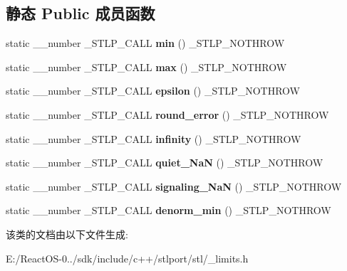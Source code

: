 \subsection*{静态 Public 成员函数}
\begin{DoxyCompactItemize}
\item 
\mbox{\label{class___numeric__limits__base_a5df53ee80883ac0ef0ba931ebc8cdec0}} 
static \+\_\+\+\_\+number \+\_\+\+S\+T\+L\+P\+\_\+\+C\+A\+LL {\bfseries min} () \+\_\+\+S\+T\+L\+P\+\_\+\+N\+O\+T\+H\+R\+OW
\item 
\mbox{\label{class___numeric__limits__base_a5b8a09617c24b0a9a44a8865344ba6ec}} 
static \+\_\+\+\_\+number \+\_\+\+S\+T\+L\+P\+\_\+\+C\+A\+LL {\bfseries max} () \+\_\+\+S\+T\+L\+P\+\_\+\+N\+O\+T\+H\+R\+OW
\item 
\mbox{\label{class___numeric__limits__base_a41abb8cff48dfdfd0837471127ff77cd}} 
static \+\_\+\+\_\+number \+\_\+\+S\+T\+L\+P\+\_\+\+C\+A\+LL {\bfseries epsilon} () \+\_\+\+S\+T\+L\+P\+\_\+\+N\+O\+T\+H\+R\+OW
\item 
\mbox{\label{class___numeric__limits__base_a6d32ab73462daf33275806255beeaea2}} 
static \+\_\+\+\_\+number \+\_\+\+S\+T\+L\+P\+\_\+\+C\+A\+LL {\bfseries round\+\_\+error} () \+\_\+\+S\+T\+L\+P\+\_\+\+N\+O\+T\+H\+R\+OW
\item 
\mbox{\label{class___numeric__limits__base_a8271331d1179bf6fa70550590bda1975}} 
static \+\_\+\+\_\+number \+\_\+\+S\+T\+L\+P\+\_\+\+C\+A\+LL {\bfseries infinity} () \+\_\+\+S\+T\+L\+P\+\_\+\+N\+O\+T\+H\+R\+OW
\item 
\mbox{\label{class___numeric__limits__base_a112e36a36d4f771ded7a70427e8d24ec}} 
static \+\_\+\+\_\+number \+\_\+\+S\+T\+L\+P\+\_\+\+C\+A\+LL {\bfseries quiet\+\_\+\+NaN} () \+\_\+\+S\+T\+L\+P\+\_\+\+N\+O\+T\+H\+R\+OW
\item 
\mbox{\label{class___numeric__limits__base_a97f37ea59a7953c5490a91eee25eb2e0}} 
static \+\_\+\+\_\+number \+\_\+\+S\+T\+L\+P\+\_\+\+C\+A\+LL {\bfseries signaling\+\_\+\+NaN} () \+\_\+\+S\+T\+L\+P\+\_\+\+N\+O\+T\+H\+R\+OW
\item 
\mbox{\label{class___numeric__limits__base_a9fb607f7fe6019017e820b35c4c86697}} 
static \+\_\+\+\_\+number \+\_\+\+S\+T\+L\+P\+\_\+\+C\+A\+LL {\bfseries denorm\+\_\+min} () \+\_\+\+S\+T\+L\+P\+\_\+\+N\+O\+T\+H\+R\+OW
\end{DoxyCompactItemize}


该类的文档由以下文件生成\+:\begin{DoxyCompactItemize}
\item 
E\+:/\+React\+O\+S-\/0../sdk/include/c++/stlport/stl/\+\_\+limits.\+h\end{DoxyCompactItemize}

